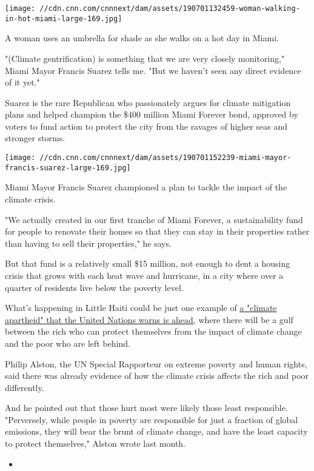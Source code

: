 \texttt{[image: //cdn.cnn.com/cnnnext/dam/assets/190701132459-woman-walking-in-hot-miami-large-169.jpg]}

A woman uses an umbrella for shade as she walks on a hot day in Miami.

"(Climate gentrification) is something that we are very closely
monitoring," Miami Mayor Francis Suarez tells me. "But we haven't seen
any direct evidence of it yet."

Suarez is the rare Republican who passionately argues for climate
mitigation plans and helped champion the \$400 million Miami Forever
bond, approved by voters to fund action to protect the city from the
ravages of higher seas and stronger storms.

\texttt{[image: //cdn.cnn.com/cnnnext/dam/assets/190701152239-miami-mayor-francis-suarez-large-169.jpg]}

Miami Mayor Francis Suarez championed a plan to tackle the impact of the
climate crisis.

"We actually created in our first tranche of Miami Forever, a
sustainability fund for people to renovate their homes so that they can
stay in their properties rather than having to sell their properties,"
he says.

But that fund is a relatively small \$15 million, not enough to dent a
housing crisis that grows with each heat wave and hurricane, in a city
where over a quarter of residents live below the poverty level.

What's happening in Little Haiti could be just one example of
\href{https://www.cnn.com/2019/06/25/world/climate-apartheid-poverty-un-intl/index.html}{a
"climate apartheid" that the United Nations warns is ahead}, where there
will be a gulf between the rich who can protect themselves from the
impact of climate change and the poor who are left behind.

Philip Alston, the UN Special Rapporteur on extreme poverty and human
rights, said there was already evidence of how the climate crisis
affects the rich and poor differently.

And he pointed out that those hurt most were likely those least
responsible. "Perversely, while people in poverty are responsible for
just a fraction of global emissions, they will bear the brunt of climate
change, and have the least capacity to protect themselves," Alston wrote
last month.

\begin{itemize}
\item
\end{itemize}

